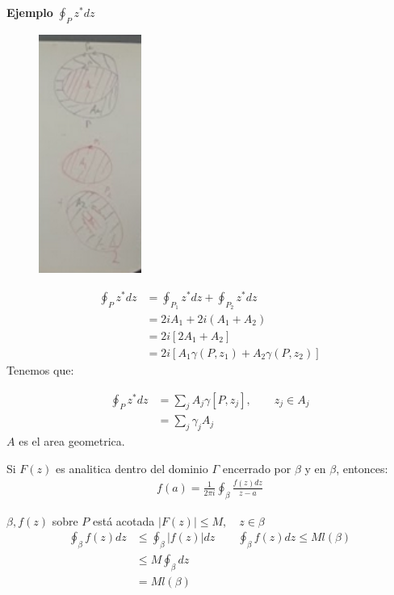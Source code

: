 \documentclass{article}
\newcommand{\caja}[3]{%
  \begin{tcolorbox}[colback=#1!5!white,colframe=#1!25!black,title=#2]
    #3
  \end{tcolorbox}%
}
\begin{document}
\textbf{Ejemplo } $ \displaystyle\oint_{P }^{} z ^* dz  $ 
\begin{figure}[H]
  \begin{center}
    \includegraphics[width=0.3\textwidth]{ej2.png}
  \end{center}
\end{figure}
\begin{align*}
  \displaystyle\oint_{P }^{} z ^* dz &= \displaystyle\oint_{P_1 }^{} z ^* dz+ \displaystyle\oint_{P_2 }^{} z ^* dz\\
        &= 2 i A_1 + 2 i (A_1 + A_2)\\
        &= 2i \left[2A_1 + A_2 \right] \\
        &= 2i \left[A_1 \gamma(P,z_1) + A_2 \gamma(P,z_2 )\right]
\end{align*}
Tenemos que: 
\caja{red}{}{
  \begin{align*}
    \displaystyle\oint_{P }^{}z^*dz  &= \displaystyle\sum_{j }^{}A_j \gamma[P,z_j ], \qquad z_j \in A_j \\
      &= \displaystyle\sum_{j }^{}\gamma_j A_j 
  \end{align*}
  $ A  $ es el area geometrica.
}

\caja{green}{Formula integral de Cauchy }{
  Si $ F(z)  $ es analitica dentro del dominio $ \Gamma  $ encerrado por $ \beta $ y en $ \beta $, entonces: 
  \begin{gather*}
    f(a) = \frac{1}{2\pi i } \displaystyle\oint_{\beta }^{} \frac{f(z) dz }{z-a } 
  \end{gather*}
}

\caja{green}{Teorema de acotacion }{
  $ \beta, f(z)  $ sobre $ P  $ está acotada $ \left|F(z)\right| \leq M , \quad z \in \beta $
  \begin{align*}
    \oint_\beta f(z) dz &\leq \oint_\beta \left|f(z) \right|dz \qquad \oint_\beta f(z)dz \leq Ml(\beta) \\
    &\leq M \oint_\beta dz \\
    &= M l(\beta)
  \end{align*}
}
\end{document}
